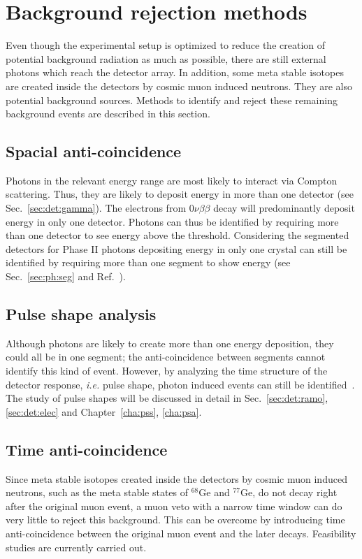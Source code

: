 \section{Background rejection methods}
\label{sec:gerda:anti}
Even though the experimental setup is optimized to reduce the creation of potential background radiation as much as possible, there are still external photons which reach the detector array. In addition, some meta stable isotopes are created inside the detectors by cosmic muon induced neutrons. They are also potential background sources. Methods to identify and reject these remaining background events are described in this section.

\subsection{Spacial anti-coincidence} 
\label{sec:gerda:santi}
Photons in the relevant energy range are most likely to interact via Compton scattering. Thus, they are likely to deposit energy in more than one detector (see Sec.~\ref{sec:det:gamma}). The electrons from $0\nu\beta\beta$ decay will predominantly deposit energy in only one detector. Photons can thus be identified by requiring more than one detector to see energy above the threshold. Considering the segmented detectors for Phase II photons depositing energy in only one crystal can still be identified by requiring more than one segment to show energy (see Sec.~\ref{sec:ph:seg} and Ref.~\cite{Sipid}).

\subsection{Pulse shape analysis}
\label{sec:gerda:psa}
Although photons are likely to create more than one energy deposition, they could all be in one segment; the anti-coincidence between segments cannot identify this kind of event. However, by analyzing the time structure of the detector response, \textit{i.e.} pulse shape, photon induced events can still be identified~\cite{Kev07}. The study of pulse shapes will be discussed in detail in Sec.~\ref{sec:det:ramo}, \ref{sec:det:elec} and Chapter~\ref{cha:pss}, \ref{cha:psa}.

\subsection{Time anti-coincidence} 
\label{sec:gerda:tanti}
Since meta stable isotopes created inside the detectors by cosmic muon induced neutrons, such as the meta stable states of $^{68}$Ge and $^{77}$Ge, do not decay right after the original muon event, a muon veto with a narrow time window can do very little to reject this background. This can be overcome by introducing time anti-coincidence between the original muon event and the later decays. Feasibility studies are currently carried out.

